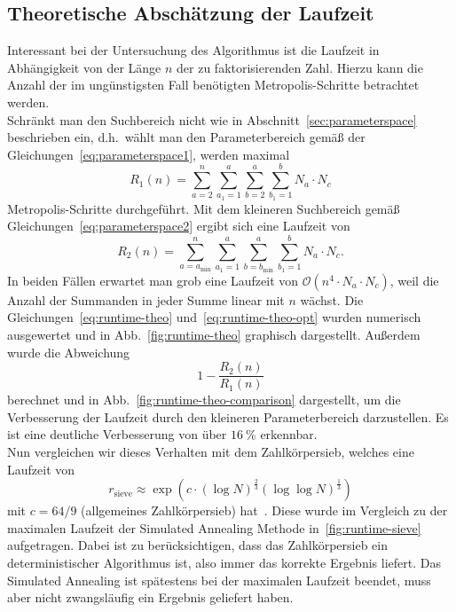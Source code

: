 \subsection{Theoretische Abschätzung der Laufzeit}\label{sec:runtime-theo}
Interessant bei der Untersuchung des Algorithmus ist die Laufzeit in Abhängigkeit von der Länge $n$ der zu faktorisierenden Zahl. Hierzu kann die Anzahl der im ungünstigsten Fall benötigten Metropolis-Schritte betrachtet werden. \\
Schränkt man den Suchbereich nicht wie in Abschnitt~\ref{sec:parameterspace} beschrieben ein, d.h.\ wählt man den Parameterbereich gemäß der Gleichungen~\eqref{eq:parameterspace1}, werden maximal
\begin{equation}
		R_1\left(n\right)=\sum\limits_{a=2}^{n}\sum\limits_{a_1=1}^{a}\sum\limits_{b=2}^{a}\sum\limits_{b_1=1}^{b}N_a\cdot N_c\label{eq:runtime-theo}
\end{equation}
Metropolis-Schritte durchgeführt. Mit dem kleineren Suchbereich gemäß Gleichungen~\eqref{eq:parameterspace2} ergibt sich eine Laufzeit von
\begin{equation}
		R_2\left(n\right)=\sum\limits_{a=a_\mathrm{\min}}^{n}\sum\limits_{a_1=1}^{a}\sum\limits_{b=b_\mathrm{\min}}^{a}\sum\limits_{b_1=1}^{b}N_a\cdot N_c\label{eq:runtime-theo-opt}.
\end{equation}
In beiden Fällen erwartet man grob eine Laufzeit von $\mathcal{O}\left(n^4\cdot N_a\cdot N_c\right)$, weil die Anzahl der Summanden in jeder Summe linear mit $n$ wächst. Die Gleichungen~\eqref{eq:runtime-theo} und~\eqref{eq:runtime-theo-opt} wurden numerisch ausgewertet und in Abb.~\ref{fig:runtime-theo} graphisch dargestellt. Außerdem wurde die Abweichung
\begin{equation*}
		1-\frac{R_2\left(n\right)}{R_1\left(n\right)}
\end{equation*}
berechnet und in Abb.~\ref{fig:runtime-theo-comparison} dargestellt, um die Verbesserung der Laufzeit durch den kleineren Parameterbereich darzustellen. Es ist eine deutliche Verbesserung von über $\SI{16}{\percent}$ erkennbar. \\
Nun vergleichen wir dieses Verhalten mit dem Zahlkörpersieb, welches eine Laufzeit von 
\begin{equation}
		r_\mathrm{sieve}\approx\exp\left(c\cdot{\left(\log N\right)}^\frac{2}{3}{\left(\log\log N\right)}^\frac{1}{3}\right)\label{eq:runtime-sieve}
\end{equation}
mit $c=64/9$ (allgemeines Zahlkörpersieb) hat~\parencite{pomerance}. Diese wurde im Vergleich zu der maximalen Laufzeit der Simulated Annealing Methode in~\ref{fig:runtime-sieve} aufgetragen. Dabei ist zu berücksichtigen, dass das Zahlkörpersieb ein deterministischer Algorithmus ist, also immer das korrekte Ergebnis liefert. Das Simulated Annealing ist spätestens bei der maximalen Laufzeit beendet, muss aber nicht zwangsläufig ein Ergebnis geliefert haben.
